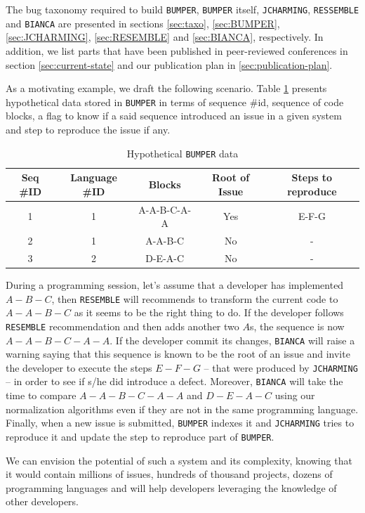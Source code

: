 The bug taxonomy required to build {\tt BUMPER}, {\tt BUMPER} itself, {\tt JCHARMING}, {\tt RESSEMBLE} and {\tt BIANCA} are presented in sections \ref{sec:taxo}, \ref{sec:BUMPER}, \ref{sec:JCHARMING}, \ref{sec:RESEMBLE} and \ref{sec:BIANCA}, respectively. In addition, we list parts that have been published in peer-reviewed conferences in section \ref{sec:current-state} and our publication plan in \ref{sec:publication-plan}.

As a motivating example, we draft the following scenario. Table \ref{tab:bumper-hypo} presents hypothetical data stored in {\tt BUMPER} in terms of sequence \#id, sequence of code blocks, a flag to know if a said sequence introduced an issue in a given system and step to reproduce the issue if any.

\begin{table}[h!]
\centering
\begin{tabular}{c|c|c|c|c}
Seq \#ID & Language \#ID & Blocks & Root of Issue & Steps to reproduce \\ \hline \hline
1        & 1             & A-A-B-C-A-A   & Yes  & E-F-G         \\
2        & 1             & A-A-B-C       & No   & -         \\
3        & 2             & D-E-A-C       & No &  - \\ \hline \hline
\end{tabular}
\caption{Hypothetical {\tt BUMPER} data}
\label{tab:bumper-hypo}
\end{table}

During a programming session, let's assume that a developer has implemented $A-B-C$, then {\tt RESEMBLE} will recommends to transform the current code to $A-A-B-C$ as it seems to be the right thing to do.
If the developer follows {\tt RESEMBLE} recommendation and then adds another two $A$s, the sequence is now $A-A-B-C-A-A$.
If the developer commit its changes, {\tt BIANCA} will raise a warning saying that this sequence is known to be the root of an issue and invite the developer to execute the steps $E-F-G$ -- that were produced by {\tt JCHARMING} -- in order to see if s/he did introduce a defect. Moreover, {\tt BIANCA} will take the time to compare $A-A-B-C-A-A$ and $D-E-A-C$ using our normalization algorithms even if they are not in the same programming language.
Finally, when a new issue is submitted, {\tt BUMPER} indexes it and {\tt JCHARMING} tries to reproduce it and update the step to reproduce part of {\tt BUMPER}.

We can envision the potential of such a system and its complexity, knowing that it would contain millions of issues, hundreds of thousand projects, dozens of programming languages and will help developers leveraging the knowledge of other developers.

